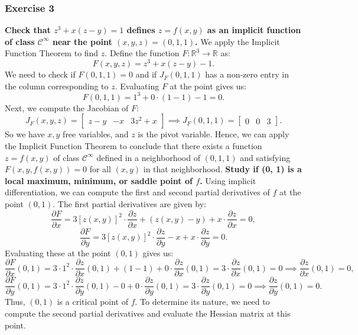 \documentclass[11pt]{article}
\begin{document}
\subsubsection*{Exercise 3}
\textbf{Check that \(z^3 + x(z - y) = 1\) defines \(z = f(x, y)\) as an implicit function of class \(\mathcal{C}^{\infty}\) near the point \((x, y, z) = (0, 1, 1)\).}
\vskip 0.5cm
We apply the Implicit Function Theorem to find \(z\). Define the function \(F : \mathbb{R}^3 \to \mathbb{R}\) as:
\[F(x, y, z) = z^3 + x(z - y) - 1.\]
We need to check if \(F(0, 1, 1) = 0\) and if \(J_F(0, 1, 1)\) has a non-zero entry in the column corresponding to \(z\). Evaluating \(F\) at the point gives us:
\[F(0, 1, 1) = 1^3 + 0 \cdot (1 - 1) - 1 = 0.\]
Next, we compute the Jacobian of \(F\):
\[J_F(x, y, z) = \begin{bmatrix} z - y & -x & 3z^2 + x \end{bmatrix} \implies J_F(0, 1, 1) = \begin{bmatrix} 0 & 0 & 3 \end{bmatrix}.\]
So we have \(x, y\) free variables, and \(z\) is the pivot variable. Hence, we can apply the Implicit Function Theorem to conclude that there exists a function \(z = f(x, y)\) of class \(\mathcal{C}^{\infty}\) defined in a neighborhood of \((0, 1, 1)\) and satisfying \(F(x, y, f(x, y)) = 0\) for all \((x, y)\) in that neighborhood.
\vskip 0.5cm
\textbf{Study if (0, 1) is a local maximum, minimum, or saddle point of \(f\).}
\vskip 0.5cm
Using implicit differentiation, we can compute the first and second partial derivatives of \(f\) at the point \((0, 1)\). The first partial derivatives are given by:
\[\frac{\partial F}{\partial x} = 3 \left[z(x, y)\right]^2 \cdot \frac{\partial z}{\partial x} + (z(x, y) - y) + x \cdot \frac{\partial z}{\partial x} = 0,\]
\[\frac{\partial F}{\partial y} = 3 \left[z(x, y)\right]^2 \cdot \frac{\partial z}{\partial y} - x + x \cdot \frac{\partial z}{\partial y} = 0.\]
Evaluating these at the point \((0, 1)\) gives us:
\[\frac{\partial F}{\partial x}(0, 1) = 3 \cdot 1^2 \cdot \frac{\partial z}{\partial x}(0, 1) + (1 - 1) + 0 \cdot \frac{\partial z}{\partial x}(0, 1) = 3 \cdot \frac{\partial z}{\partial x}(0, 1) = 0 \implies \frac{\partial z}{\partial x}(0, 1) = 0,\]
\[\frac{\partial F}{\partial y}(0, 1) = 3 \cdot 1^2 \cdot \frac{\partial z}{\partial y}(0, 1) - 0 + 0 \cdot \frac{\partial z}{\partial y}(0, 1) = 3 \cdot \frac{\partial z}{\partial y}(0, 1) = 0 \implies \frac{\partial z}{\partial y}(0, 1) = 0.\]
Thus, \((0, 1)\) is a critical point of \(f\). To determine its nature, we need to compute the second partial derivatives and evaluate the Hessian matrix at this point.
\end{document}
